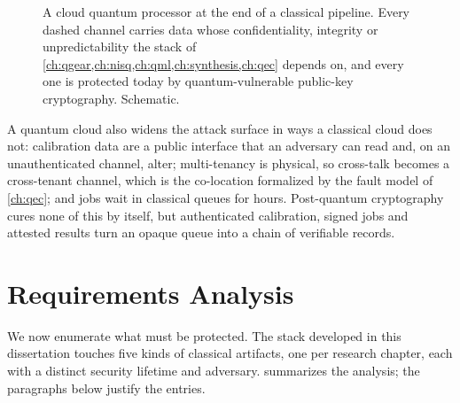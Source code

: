 \begin{figure}[htbp]
\caption{A cloud quantum processor at the end of a classical pipeline. Every dashed channel carries data whose confidentiality, integrity or unpredictability the stack of \cref{ch:qgear,ch:nisq,ch:qml,ch:synthesis,ch:qec} depends on, and every one is protected today by quantum-vulnerable public-key cryptography. Schematic.}
\label{fig:pqc:stack}
\end{figure}

A quantum cloud also widens the attack surface in ways a classical cloud does not: calibration data are a public interface that an adversary can read and, on an unauthenticated channel, alter; multi-tenancy is physical, so cross-talk becomes a cross-tenant channel, which is the co-location formalized by the fault model of \cref{ch:qec}; and jobs wait in classical queues for hours. Post-quantum cryptography cures none of this by itself, but authenticated calibration, signed jobs and attested results turn an opaque queue into a chain of verifiable records.

\section{Requirements Analysis}\label{sec:pqc:requirements}

We now enumerate what must be protected. The stack developed in this dissertation touches five kinds of classical artifacts, one per research chapter, each with a distinct security lifetime and adversary.  summarizes the analysis; the paragraphs below justify the entries.


